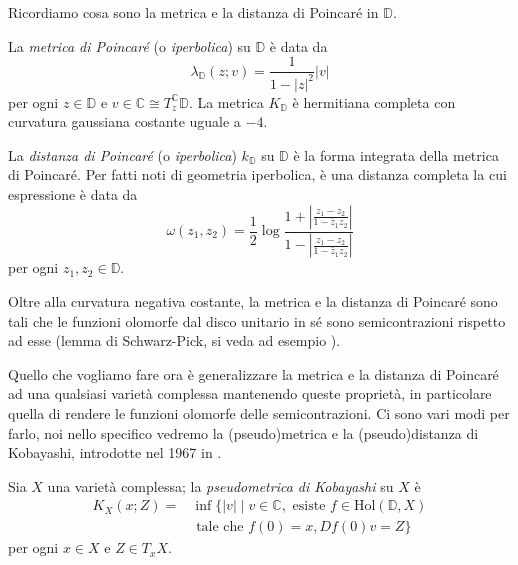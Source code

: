 Ricordiamo cosa sono la metrica e la distanza di Poincaré in $\mathbb{D}$.

\begin{defn}
    La \textit{metrica di Poincaré} (o \textit{iperbolica}) su $\mathbb{D}$ è data da
    \begin{equation}
        \lambda_{\mathbb{D}}(z;v)=\frac{1}{1-|z|^2}|v|
    \end{equation}
    per ogni $z \in \mathbb{D}$ e $v \in \mathbb{C}\cong T_z^{\mathbb{C}}\mathbb{D}$. La metrica $K_{\mathbb{D}}$ è hermitiana completa con curvatura gaussiana costante uguale a $-4$.
\end{defn}

\begin{defn}
    La \textit{distanza di Poincaré} (o \textit{iperbolica}) $k_{\mathbb{D}}$ su $\mathbb{D}$ è la forma integrata della metrica di Poincaré. Per fatti noti di geometria iperbolica, è una distanza completa la cui espressione è data da
    \begin{equation}
        \omega(z_1,z_2)=\frac{1}{2}\log{\frac{1+\left|\frac{z_1-z_2}{1-\bar{z}_1z_2}\right|}{1-\left|\frac{z_1-z_2}{1-\bar{z}_1z_2}\right|}}
    \end{equation}
    per ogni $z_1,z_2 \in \mathbb{D}$.
\end{defn}

Oltre alla curvatura negativa costante, la metrica e la distanza di Poincaré sono tali che le funzioni olomorfe dal disco unitario in sé sono semicontrazioni rispetto ad esse (lemma di Schwarz-Pick, si veda ad esempio \cite[Chapter I, paragraph 1, Theorem 1.1]{K2}).

Quello che vogliamo fare ora è generalizzare la metrica e la distanza di Poincaré ad una qualsiasi varietà complessa mantenendo queste proprietà, in particolare quella di rendere le funzioni olomorfe delle semicontrazioni. Ci sono vari modi per farlo, noi nello specifico vedremo la (pseudo)metrica e la (pseudo)distanza di Kobayashi, introdotte nel 1967 in \cite{K1}.

\begin{defn}
    Sia $X$ una varietà complessa; la \textit{pseudometrica di Kobayashi} su $X$ è
    \begin{equation}\begin{split}
        K_X(x;Z)=&\inf\{|v| \mid v \in \mathbb{C}, \text{ esiste }f \in \text{Hol}(\mathbb{D},X) \\
        &\text{ tale che } f(0)=x, Df(0)v=Z\}
    \end{split}\end{equation}
    per ogni $x \in X$ e $Z \in T_xX$.
\end{defn}

